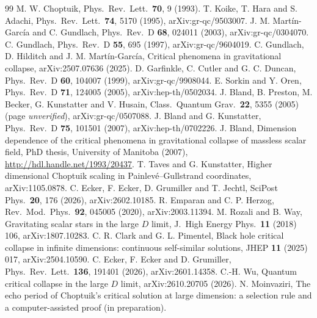 \documentclass[aps,prd,onecolumn,superscriptaddress,nofootinbib,10pt]{revtex4-2}
\begin{document}
\begin{thebibliography}{99}
 M. W. Choptuik, Phys.\ Rev.\ Lett.\ \textbf{70}, 9 (1993).
 T. Koike, T. Hara and S. Adachi, Phys.\ Rev.\ Lett.\ \textbf{74}, 5170 (1995),
arXiv:gr-qc/9503007.
 J. M. Mart\'in-Garc\'ia and C. Gundlach, Phys.\ Rev.\ D \textbf{68}, 024011 (2003),
arXiv:gr-qc/0304070.
 C. Gundlach, Phys.\ Rev.\ D \textbf{55}, 695 (1997), arXiv:gr-qc/9604019.
 C. Gundlach, D. Hilditch and J. M. Mart\'in-Garc\'ia, Critical phenomena in
gravitational collapse, arXiv:2507.07636 (2025).
 D. Garfinkle, C. Cutler and G. C. Duncan, Phys.\ Rev.\ D \textbf{60}, 104007 (1999),
arXiv:gr-qc/9908044.
 E. Sorkin and Y. Oren, Phys.\ Rev.\ D \textbf{71}, 124005 (2005), arXiv:hep-th/0502034.
 J. Bland, B. Preston, M. Becker, G. Kunstatter and V. Husain, Class.\ Quantum Grav.\ \textbf{22},
5355 (2005) (page \emph{unverified}), arXiv:gr-qc/0507088.
 J. Bland and G. Kunstatter, Phys.\ Rev.\ D \textbf{75}, 101501 (2007), arXiv:hep-th/0702226.
 J. Bland, Dimension dependence of the critical phenomena in gravitational collapse of massless
scalar field, PhD thesis, University of Manitoba (2007), \url{http://hdl.handle.net/1993/20437}.
 T. Taves and G. Kunstatter, Higher dimensional Choptuik scaling in Painlev\'e--Gullstrand
coordinates, arXiv:1105.0878.
 C. Ecker, F. Ecker, D. Grumiller and T. Jechtl, SciPost Phys.\ \textbf{20}, 176 (2026),
arXiv:2602.10185.
 R. Emparan and C. P. Herzog, Rev.\ Mod.\ Phys.\ \textbf{92}, 045005 (2020), arXiv:2003.11394.
 M. Rozali and B. Way, Gravitating scalar stars in the large $D$ limit, J.\ High Energy Phys.\
\textbf{11} (2018) 106, arXiv:1807.10283.
 C. R. Clark and G. L. Pimentel, Black hole critical collapse in infinite dimensions: continuous
self-similar solutions, JHEP \textbf{11} (2025) 017, arXiv:2504.10590.
\bibitem{EckerEckerGrumiller2026} C. Ecker, F. Ecker and D. Grumiller, Phys.\ Rev.\ Lett.\ \textbf{136}, 191401 (2026),
arXiv:2601.14358.
 C.-H. Wu, Quantum critical collapse in the large $D$ limit, arXiv:2610.20705 (2026).
\bibitem{math} N. Moinvaziri, The echo period of Choptuik's critical solution at large dimension: a selection rule and
a computer-assisted proof (in preparation).

\end{thebibliography}
\end{document}
